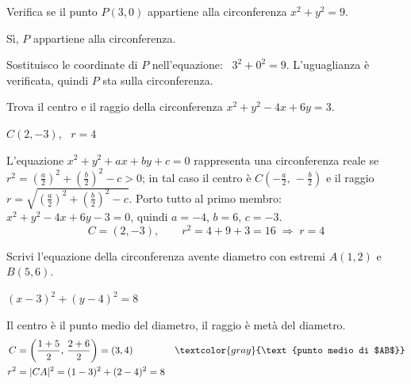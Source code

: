 
\begin{question}[ID=2.3, subtitle={Verifica dell'appartenenza del punto $P(3,0)$}, difficulty=facile, tags={circonferenza}]
Verifica se il punto $P(3,0)$ appartiene alla circonferenza $x^2 + y^2 = 9$.
\begin{solution}
Sì, $P$ appartiene alla circonferenza.
\end{solution}
\begin{explanation}
Sostituisco le coordinate di $P$ nell'equazione: \ $3^2+0^2=9$. L'uguaglianza è verificata, quindi $P$ sta sulla circonferenza.
\end{explanation}
\end{question}


\begin{question}[ID=2.4, subtitle={Centro e raggio di $x^2+y^2-4x+6y=3$}, difficulty=facile, tags={circonferenza}]
Trova il centro e il raggio della circonferenza $x^2 + y^2 - 4x + 6y = 3$.
\begin{solution}
$C(2,-3)$, \ $r=4$
\end{solution}
\begin{explanation}
L'equazione $x^2+y^2+ax+by+c=0$ rappresenta una circonferenza reale se $r^2=\left(\tfrac a2\right)^2+\left(\tfrac b2\right)^2-c>0$; in tal caso il centro è $C\left(-\tfrac a2,\,-\tfrac b2\right)$ e il raggio $r=\sqrt{\left(\tfrac a2\right)^2+\left(\tfrac b2\right)^2-c}$.
Porto tutto al primo membro: $x^2+y^2-4x+6y-3=0$, quindi $a=-4$, $b=6$, $c=-3$.
\[ C=(2,-3), \qquad r^2=4+9+3=16 \;\Rightarrow\; r=4 \]
\end{explanation}
\end{question}


\begin{question}[ID=2.5, subtitle={Circonferenza avente un segmento come diametro}, difficulty=media, tags={circonferenza}]
Scrivi l'equazione della circonferenza avente diametro con estremi $A(1,2)$ e $B(5,6)$.
\begin{solution}
$(x-3)^2+(y-4)^2=8$
\end{solution}
\begin{explanation}
Il centro è il punto medio del diametro, il raggio è metà del diametro.
\[\begin{aligned}
C &= \left(\dfrac{1+5}{2},\,\dfrac{2+6}{2}\right)=(3,4) && \textcolor{gray}{\text{punto medio di $AB$}}\\
r^2 &= |CA|^2=(1-3)^2+(2-4)^2=8
\end{aligned}\]
\end{explanation}
\end{question}

